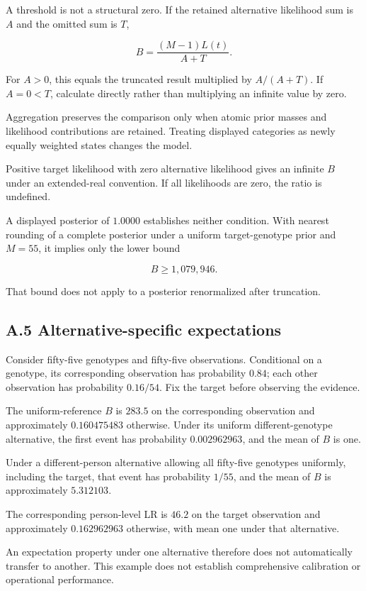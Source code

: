\documentclass[
]{article}
\begin{document}
A threshold is not a structural zero. If the retained alternative
likelihood sum is \(A\) and the omitted sum is \(T\),

\[
B=\frac{(M-1)L(t)}{A+T}.
\]

For \(A>0\), this equals the truncated result multiplied by \(A/(A+T)\).
If \(A=0<T\), calculate directly rather than multiplying an infinite
value by zero.

Aggregation preserves the comparison only when atomic prior masses and
likelihood contributions are retained. Treating displayed categories as
newly equally weighted states changes the model.

Positive target likelihood with zero alternative likelihood gives an
infinite \(B\) under an extended-real convention. If all likelihoods are
zero, the ratio is undefined.

A displayed posterior of \(1.0000\) establishes neither condition. With
nearest rounding of a complete posterior under a uniform target-genotype
prior and \(M=55\), it implies only the lower bound

\[
B\geq1{,}079{,}946.
\]

That bound does not apply to a posterior renormalized after truncation.

\subsection{A.5 Alternative-specific
expectations}\label{a.5-alternative-specific-expectations}

Consider fifty-five genotypes and fifty-five observations. Conditional
on a genotype, its corresponding observation has probability \(0.84\);
each other observation has probability \(0.16/54\). Fix the target
before observing the evidence.

The uniform-reference \(B\) is \(283.5\) on the corresponding
observation and approximately \(0.160475483\) otherwise. Under its
uniform different-genotype alternative, the first event has probability
\(0.002962963\), and the mean of \(B\) is one.

Under a different-person alternative allowing all fifty-five genotypes
uniformly, including the target, that event has probability \(1/55\),
and the mean of \(B\) is approximately \(5.312103\).

The corresponding person-level LR is \(46.2\) on the target observation
and approximately \(0.162962963\) otherwise, with mean one under that
alternative.

An expectation property under one alternative therefore does not
automatically transfer to another. This example does not establish
comprehensive calibration or operational performance.
\end{document}
